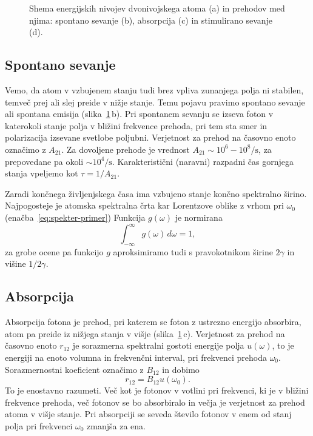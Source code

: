 \begin{figure}[h]
\centering
\def\svgwidth{140truemm} 

\caption{Shema energijskih nivojev dvonivojskega atoma (a) in prehodov med njima:
spontano sevanje (b), absorpcija (c) in stimulirano sevanje (d).}
\label{sl4.1}
\end{figure}

\subsection*{Spontano sevanje}
Vemo, da atom v vzbujenem stanju tudi brez vpliva zunanjega polja
ni stabilen, temveč prej ali slej preide v nižje stanje. Temu pojavu
pravimo spontano sevanje ali spontana emisija (slika~\ref{sl4.1}\,b). 
Pri spontanem sevanju se izseva foton v katerokoli stanje polja v bližini 
frekvence prehoda, pri tem sta smer in polarizacija izsevane svetlobe poljubni.
Verjetnost za prehod na časovno enoto označimo z $A_{21}$.
Za dovoljene prehode je vrednost $A_{21} \sim 10^6-10^8/\si{\second}$, 
za prepovedane pa okoli $\sim 10^4/\si{\second}$. 
Karakteristični (naravni) razpadni čas gornjega stanja vpeljemo kot
$\tau = 1/A_{21}$. 

Zaradi končnega življenjskega časa ima vzbujeno stanje končno spektralno 
širino. Najpogosteje je atomska spektralna črta kar 
Lorentzove oblike z vrhom pri $\omega_0$
(enačba~\ref{eq:spekter-primer})
Funkcija $g(\omega)$ je normirana
\begin{equation}
\int_{-\infty}^\infty g(\omega)\, d\omega=1,
\label{4.20}
\end{equation}
za grobe ocene pa funkcijo $g$ aproksimiramo tudi s pravokotnikom širine
$2\gamma$ in višine $1/2\gamma$.

\subsection*{Absorpcija}
Absorpcija fotona je prehod, pri katerem se foton 
z ustrezno energijo absorbira, atom pa preide iz nižjega stanja v višje (slika~\ref{sl4.1}\,c). 
Verjetnost za prehod na časovno enoto $r_{12}$ je sorazmerna 
spektralni gostoti energije polja $u(\omega)$, to je
energiji na enoto volumna in frekvenčni interval, 
pri frekvenci prehoda $\omega_{0}$. Sorazmernostni koeficient označimo z $B_{12}$ in 
dobimo 
\begin{equation}
r_{12}=B_{12}u(\omega_{0}).
\label{4.16}
\end{equation}
To je enostavno razumeti. Več kot je fotonov v votlini pri frekvenci, ki je
v bližini frekvence prehoda, več fotonov se bo absorbiralo in večja je 
verjetnost za prehod atoma v višje stanje. Pri absorpciji se
seveda število fotonov v enem od stanj polja pri frekvenci
$\omega_{0}$ zmanjša za ena.

